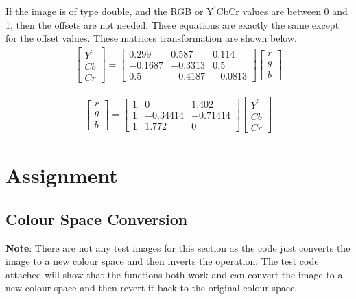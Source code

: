 \documentclass{article}
\begin{document}
	If the image is of type double, and the RGB or $\textrm{Y}^\prime$CbCr values are between 0 and 1, then the offsets are not needed. These equations are exactly the same except for the offset values. These matrices transformation are shown below.\\
	
	\begin{align}
		\begin{bmatrix}
			Y^\prime \\
			Cb \\
			Cr
		\end{bmatrix}
		= 	
		\begin{bmatrix}
			0.299 & 0.587 & 0.114\\
			-0.1687 & -0.3313 & 0.5\\
			0.5 & -0.4187 & -0.0813
		\end{bmatrix}
		\begin{bmatrix}
			r \\
			g \\
			b
		\end{bmatrix}
	\end{align}
	
	\begin{align}
		\begin{bmatrix}
			r \\
			g \\
			b
		\end{bmatrix}
		= 	
		\begin{bmatrix}
			1 & 0 & 1.402\\
			1 & -0.34414 & -0.71414\\
			1 & 1.772 & 0
		\end{bmatrix}
		\begin{bmatrix}
			Y^\prime \\
			Cb \\
			Cr
		\end{bmatrix}
	\end{align} 
	
	\section{Assignment}
	
	\subsection{Colour Space Conversion}
	
	\textbf{Note}: There are not any test images for this section as the code just converts the image to a new colour space and then inverts the operation. The test code attached will show that the functions both work and can convert the image to a new colour space and then revert it back to the original colour space.
	
\end{document}

